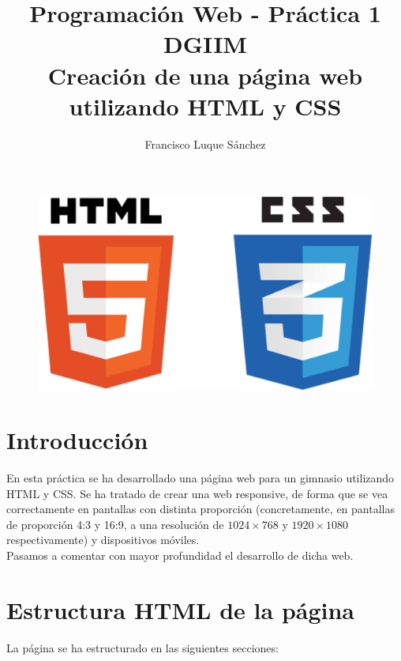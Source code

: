 \documentclass[11pt]{article}
\theoremstyle{plain}
\theoremstyle{definition}
\begin{document}
\title{Programación Web - Práctica 1\\
  DGIIM \\
  \large Creación de una página web utilizando HTML y CSS}
\author{Francisco Luque Sánchez}
\maketitle

\begin{figure}[H]
  \centering
  \includegraphics[width=.3\textwidth]{html_css.png}
\end{figure}

\tableofcontents

\section{Introducción}

En esta práctica se ha desarrollado una página web para un gimnasio
utilizando HTML y CSS. Se ha tratado de crear una web responsive, de
forma que se vea correctamente en pantallas con distinta proporción
(concretamente, en pantallas de proporción 4:3 y 16:9, a una
resolución de $1024 \times 768$ y $1920 \times 1080$ respectivamente)
y dispositivos móviles.\\

Pasamos a comentar con mayor profundidad el desarrollo de dicha web.

\section{Estructura HTML de la página}

La página se ha estructurado en las siguientes secciones:
\end{document}
